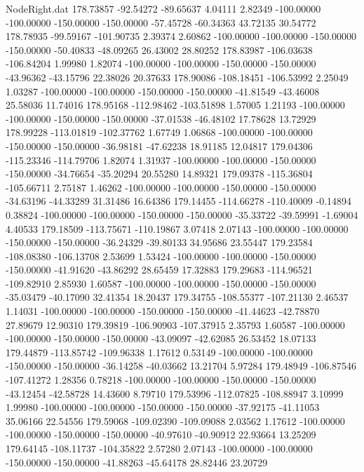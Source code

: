 \begin{filecontents}{NodeRight.dat}
 178.73857  -92.54272  -89.65637     4.04111    2.82349 -100.00000 -100.00000 -150.00000 -150.00000  -57.45728  -60.34363   43.72135   30.54772
 178.78935  -99.59167 -101.90735     2.39374    2.60862 -100.00000 -100.00000 -150.00000 -150.00000  -50.40833  -48.09265   26.43002   28.80252
 178.83987 -106.03638 -106.84204     1.99980    1.82074 -100.00000 -100.00000 -150.00000 -150.00000  -43.96362  -43.15796   22.38026   20.37633
 178.90086 -108.18451 -106.53992     2.25049    1.03287 -100.00000 -100.00000 -150.00000 -150.00000  -41.81549  -43.46008   25.58036   11.74016
 178.95168 -112.98462 -103.51898     1.57005    1.21193 -100.00000 -100.00000 -150.00000 -150.00000  -37.01538  -46.48102   17.78628   13.72929
 178.99228 -113.01819 -102.37762     1.67749    1.06868 -100.00000 -100.00000 -150.00000 -150.00000  -36.98181  -47.62238   18.91185   12.04817
 179.04306 -115.23346 -114.79706     1.82074    1.31937 -100.00000 -100.00000 -150.00000 -150.00000  -34.76654  -35.20294   20.55280   14.89321
 179.09378 -115.36804 -105.66711     2.75187    1.46262 -100.00000 -100.00000 -150.00000 -150.00000  -34.63196  -44.33289   31.31486   16.64386
 179.14455 -114.66278 -110.40009    -0.14894    0.38824 -100.00000 -100.00000 -150.00000 -150.00000  -35.33722  -39.59991   -1.69004    4.40533
 179.18509 -113.75671 -110.19867     3.07418    2.07143 -100.00000 -100.00000 -150.00000 -150.00000  -36.24329  -39.80133   34.95686   23.55447
 179.23584 -108.08380 -106.13708     2.53699    1.53424 -100.00000 -100.00000 -150.00000 -150.00000  -41.91620  -43.86292   28.65459   17.32883
 179.29683 -114.96521 -109.82910     2.85930    1.60587 -100.00000 -100.00000 -150.00000 -150.00000  -35.03479  -40.17090   32.41354   18.20437
 179.34755 -108.55377 -107.21130     2.46537    1.14031 -100.00000 -100.00000 -150.00000 -150.00000  -41.44623  -42.78870   27.89679   12.90310
 179.39819 -106.90903 -107.37915     2.35793    1.60587 -100.00000 -100.00000 -150.00000 -150.00000  -43.09097  -42.62085   26.53452   18.07133
 179.44879 -113.85742 -109.96338     1.17612    0.53149 -100.00000 -100.00000 -150.00000 -150.00000  -36.14258  -40.03662   13.21704    5.97284
 179.48949 -106.87546 -107.41272     1.28356    0.78218 -100.00000 -100.00000 -150.00000 -150.00000  -43.12454  -42.58728   14.43600    8.79710
 179.53996 -112.07825 -108.88947     3.10999    1.99980 -100.00000 -100.00000 -150.00000 -150.00000  -37.92175  -41.11053   35.06166   22.54556
 179.59068 -109.02390 -109.09088     2.03562    1.17612 -100.00000 -100.00000 -150.00000 -150.00000  -40.97610  -40.90912   22.93664   13.25209
 179.64145 -108.11737 -104.35822     2.57280    2.07143 -100.00000 -100.00000 -150.00000 -150.00000  -41.88263  -45.64178   28.82446   23.20729

\end{filecontents}
